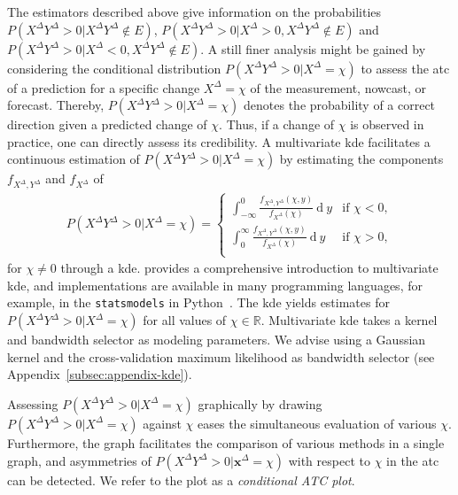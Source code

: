 \documentclass[pdflatex]{sn-jnl}
\theoremstyle{plain}%
\theoremstyle{definition}
\newcommand{\R}{\mathbb{R}}
\newcommand{\diffx}{\mathbf{x}^{\Delta}}
\newcommand{\diffxrv}{X^{\Delta}}
\newcommand{\diffyrv}{Y^{\Delta}}
\newcommand{\xcond}{\chi}
\begin{document}
The estimators described above give information on the probabilities $P(\diffxrv \diffyrv > 0 | \diffxrv \diffyrv \notin E)$, $P(\diffxrv \diffyrv > 0 | \diffxrv > 0, \diffxrv \diffyrv \notin E)$ and $P(\diffxrv \diffyrv > 0 | \diffxrv < 0, \diffxrv \diffyrv \notin E)$.
A still finer analysis might be gained by considering the conditional distribution $P(\diffxrv \diffyrv > 0 | \diffxrv = \xcond)$ to assess the \ac{atc} of a prediction for a specific change $\diffxrv = \xcond$ of the measurement, nowcast, or forecast.
Thereby, $P(\diffxrv \diffyrv > 0 | \diffxrv = \xcond)$ denotes the probability of a correct direction given a predicted change of $\xcond$.
Thus, if a change of $\xcond$ is observed in practice, one can directly assess its credibility.
A multivariate \acf{kde} facilitates a continuous estimation of $P(\diffxrv \diffyrv > 0 | \diffxrv = \xcond)$ by estimating the components $f_{\diffxrv, \diffyrv}$ and $f_{\diffxrv}$ of
\begin{align*}
P(\diffxrv \diffyrv > 0 | \diffxrv = \xcond) = \begin{cases}
                                              \int_{-\infty}^0 \frac{f_{\diffxrv, \diffyrv}(\xcond, y)}{f_{\diffxrv}(\xcond)} \ \textrm{d} \: y & \text{if } \xcond < 0, \\
                                              \int_{0}^{\infty} \frac{f_{\diffxrv, \diffyrv}(\xcond, y)}{f_{\diffxrv}(\xcond)} \ \textrm{d} \: y & \text{if } \xcond > 0, \\
\end{cases}
\end{align*}
for $\xcond \neq 0$ through a \ac{kde}.
\textcite{Gramacki2018} provides a comprehensive introduction to multivariate \ac{kde}, and implementations are available in many programming languages, for example, in the \verb|statsmodels| in Python~\parencite{Seabold2010}.
The \ac{kde} yields estimates for $P(\diffxrv \diffyrv > 0 | \diffxrv = \xcond)$ for all values of $\xcond \in \R$.
Multivariate \ac{kde} takes a kernel and bandwidth selector as modeling parameters.
We advise using a Gaussian kernel and the cross-validation maximum likelihood as bandwidth selector (see Appendix~\ref{subsec:appendix-kde}).

Assessing $P(\diffxrv \diffyrv > 0 | \diffxrv = \xcond)$ graphically by drawing $P(\diffxrv \diffyrv > 0 | \diffxrv = \xcond)$ against $\xcond$ eases the simultaneous evaluation of various $\xcond$.
Furthermore, the graph facilitates the comparison of various methods in a single graph, and asymmetries of $P(\diffxrv \diffyrv > 0 | \diffx = \xcond)$ with respect to $\xcond$ in the \ac{atc} can be detected.
We refer to the plot as a \textit{conditional ATC plot}.
\end{document}
